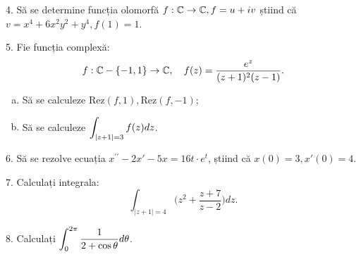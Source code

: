 \vspace{1cm}

4. Să se determine funcția olomorfă $ f : \mathbb{C} \to \mathbb{C}, f = u + iv $ știind
că $ v = x^4 + 6x^2y^2 + y^4, f(1) = 1 $.

\vspace{1cm}

5. Fie funcția complexă:
\[
  f : \CC - \{-1, 1 \} \to \CC, \quad %
  f(z) = \frac{e^z}{(z + 1)^2(z - 1)}.
\]
\begin{enumerate}[(a)]
\item Să se calculeze $ \mathrm{Rez}(f, 1), \mathrm{Rez}(f, -1) $;
\item Să se calculeze $ \displaystyle\int_{|z + 1| = 3} f(z) dz $.
\end{enumerate}

\vspace{1cm}


6. Să se rezolve ecuația $ x^{\prime\prime} - 2x' - 5x = 16t \cdot e^t $,
știind că $ x(0) = 3, x'(0) = 4 $.

\vspace{1cm}


7. Calculați integrala:
\[
  \int_{|z + 1| = 4} \Big( z^2 + \frac{z + 7}{z - 2} \Big) dz.
\]

\vspace{1cm}


8. Calculați $ \displaystyle\int_0^{2\pi} \frac{1}{2 + \cos \theta} d\theta $.


